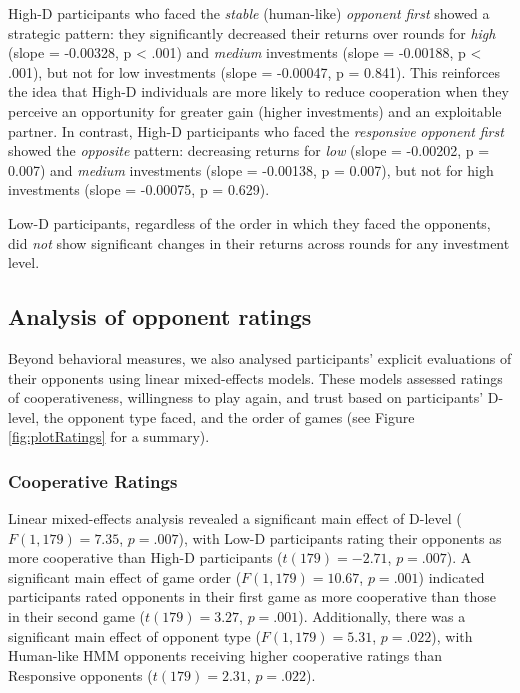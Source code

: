 \documentclass[
]{article}
\begin{document}
High-D participants who faced the \emph{stable} (human-like) \emph{opponent} \emph{first} showed a strategic pattern: they significantly decreased their returns over rounds for \emph{high} (slope = -0.00328, p \textless{} .001) and \emph{medium} investments (slope = -0.00188, p \textless{} .001), but not for low investments (slope = -0.00047, p = 0.841). This reinforces the idea that High-D individuals are more likely to reduce cooperation when they perceive an opportunity for greater gain (higher investments) and an exploitable partner. In contrast, High-D participants who faced the \emph{responsive} \emph{opponent} \emph{first} showed the \emph{opposite} pattern: decreasing returns for \emph{low} (slope = -0.00202, p = 0.007) and \emph{medium} investments (slope = -0.00138, p = 0.007), but not for high investments (slope = -0.00075, p = 0.629).

Low-D participants, regardless of the order in which they faced the opponents, did \emph{not} show significant changes in their returns across rounds for any investment level.

\subsection{Analysis of opponent ratings}\label{analysis-of-opponent-ratings}

Beyond behavioral measures, we also analysed participants' explicit evaluations of their opponents using linear mixed-effects models. These models assessed ratings of cooperativeness, willingness to play again, and trust based on participants' D-level, the opponent type faced, and the order of games (see Figure \ref{fig:plotRatings} for a summary).

\subsubsection{Cooperative Ratings}\label{cooperative-ratings}

Linear mixed-effects analysis revealed a significant main effect of D-level (\(F(1, 179) = 7.35\), \(p = .007\)), with Low-D participants rating their opponents as more cooperative than High-D participants (\(t(179) = -2.71\), \(p = .007\)). A significant main effect of game order (\(F(1, 179) = 10.67\), \(p = .001\)) indicated participants rated opponents in their first game as more cooperative than those in their second game (\(t(179) = 3.27\), \(p = .001\)). Additionally, there was a significant main effect of opponent type (\(F(1, 179) = 5.31\), \(p = .022\)), with Human-like HMM opponents receiving higher cooperative ratings than Responsive opponents (\(t(179) = 2.31\), \(p = .022\)).
\end{document}

